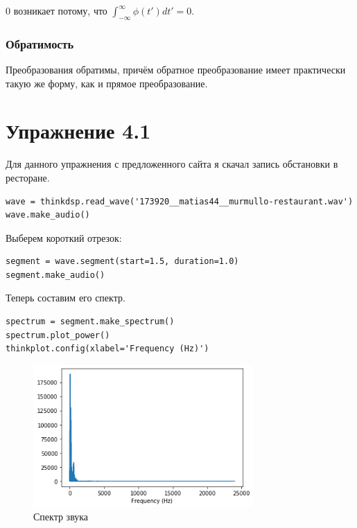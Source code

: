 \documentclass[a4paper,12pt]{report}
\begin{document}
0 возникает потому, что $\int_{-\infty}^{\infty} \phi(t') dt' = 0$.

\subsection{Обратимость}

Преобразования обратимы, причём обратное преобразование имеет практически такую же форму, как и прямое преобразование.

\chapter{Упражнение 4.1}

Для данного упражнения с предложенного сайта я скачал запись обстановки в ресторане.

\begin{lstlisting}[caption=Прослушивание скачанного шума]
wave = thinkdsp.read_wave('173920__matias44__murmullo-restaurant.wav')
wave.make_audio()
\end{lstlisting}

Выберем короткий отрезок:

\begin{lstlisting}[caption=Выбор короткого отрезка]
segment = wave.segment(start=1.5, duration=1.0)
segment.make_audio()
\end{lstlisting}

Теперь составим его спектр.

\begin{lstlisting}[caption=Спектр звука]
spectrum = segment.make_spectrum()
spectrum.plot_power()
thinkplot.config(xlabel='Frequency (Hz)')
\end{lstlisting}

\begin{figure}[H]
        \centering
        \includegraphics[width=0.75\textwidth]{lab4_fig1_1.png}
        \caption{Спектр звука}
        \label{fig:lab4_fig1_1}
\end{figure}
\end{document}
